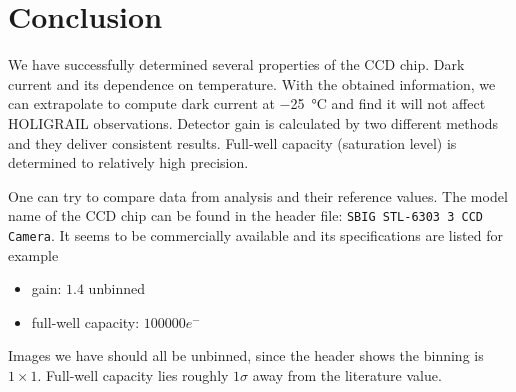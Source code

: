 \section{Conclusion}
We have successfully determined several properties of the CCD chip. Dark current and its dependence on temperature. With the obtained information, we can extrapolate to compute dark current at \SI{-25}{\degreeCelsius} and find it will not affect HOLIGRAIL observations. Detector gain is calculated by two different methods and they deliver consistent results. Full-well capacity (saturation level) is determined to relatively high precision.

One can try to compare data from analysis and their reference values. The model name of the CCD chip can be found in the header file: \verb|SBIG STL-6303 3 CCD Camera|. It seems to be commercially available and its specifications are listed for example~\cite{SBIG}
\begin{itemize}
	\item gain: $1.4$ unbinned
	\item full-well capacity: $\num{100 000} e^-$
\end{itemize}
Images we have should all be unbinned, since the header shows the binning is $1\times 1$. Full-well capacity lies roughly $1\sigma$ away from the literature value.
